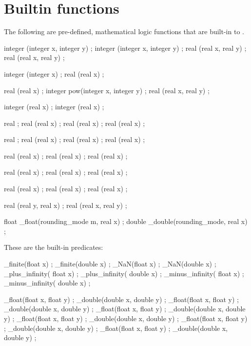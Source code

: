 \section{Builtin functions}
\label{sec:builtinns}

The following are pre-defined, mathematical logic functions that are built-in
to \NAME.

\begin{listing-nonumber}
integer \min(integer x, integer y) ;
integer \max(integer x, integer y) ;
real \min(real x, real y) ;
real \max(real x, real y) ;

integer \abs(integer x) ;
real \abs(real x) ;

real \sqrt(real x) ;
integer pow(integer x, integer y) ;
real \pow(real x, real y) ;

integer \ceil(real x) ;
integer \floor(real x) ;

real \e ;
real \exp(real x) ;
real \log(real x) ;
real (real x) ;

real \pi ;
real \sin(real x) ;
real \cos(real x) ;
real \tan(real x) ;

real \cosh(real x) ;
real \sinh(real x) ;
real \tanh(real x) ;

real \asin(real x) ;
real \acos(real x) ;
real \atan(real x) ;

real \asinh(real x) ;
real \acosh(real x) ;
real \atanh(real x) ;

real (real y, real x) ;
real \hypot(real x, real y) ;

float \round_float(rounding_mode m, real x) ;
double \round_double(rounding_mode, real x) ;

\end{listing-nonumber}

These are the built-in predicates:
\begin{listing-nonumber}
 \is_finite(float x) ;
 \is_finite(double x) ;
 \is_NaN(float x) ;
 \is_NaN(double x) ;
 \is_plus_infinity( float x) ;
 \is_plus_infinity( double x) ;
 \is_minus_infinity( float x) ;
 \is_minus_infinity( double x) ;

 \eq_float(float x, float y) ;
 \eq_double(double x, double y) ;
 \gt_float(float x, float y) ;
 \gt_double(double x, double y) ;
 \ge_float(float x, float y) ;
 \ge_double(double x, double y) ;
 \lt_float(float x, float y) ;
 \lt_double(double x, double y) ;
 \le_float(float x, float y) ;
 \le_double(double x, double y) ;
 \ne_float(float x, float y) ;
 \ne_double(double x, double y) ;
 

\end{listing-nonumber}



